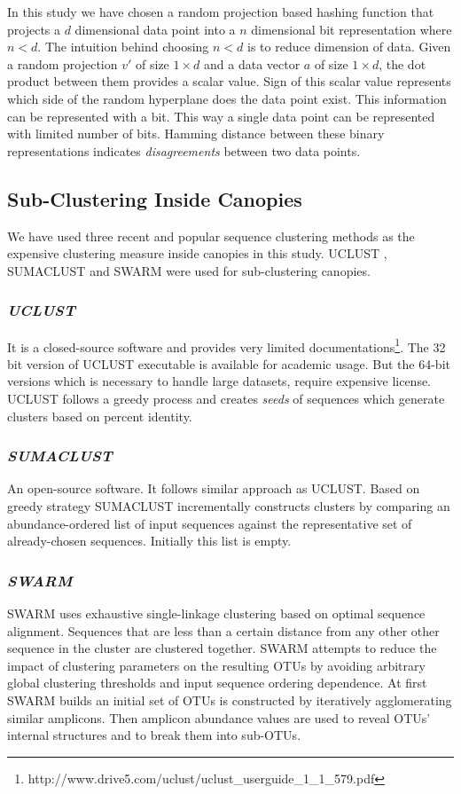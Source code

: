\documentclass[10pt, conference, compsocconf]{IEEEtran}
\begin{document}
In this study we have chosen a random projection based hashing function that projects a $d$ dimensional data point into a $n$ dimensional bit representation where $n<d$. The intuition behind choosing $n<d$ is to reduce dimension of data. Given a random projection $v'$ of size $1 \times d$ and a data vector $a$ of size $1 \times d$, the dot product between them provides a scalar value. Sign of this scalar value represents which side of the random hyperplane does the data point exist. This information can be represented with a bit. This way a single data point can be represented with limited number of bits. Hamming distance between these binary representations indicates \textit{disagreements} between two data points.

\subsection{\textbf{Sub-Clustering Inside Canopies}}
\label{sub-cluster}
We have used three recent and popular sequence clustering methods as the expensive clustering measure inside canopies in this study. UCLUST \cite{MARuclust}, SUMACLUST \cite{MARSumaclust} and SWARM \cite{MARSwarm} were used for sub-clustering canopies. 

\subsubsection{\textit{UCLUST}}
It is a closed-source software and provides very limited documentations\footnote{http://www.drive5.com/uclust/uclust\_userguide\_1\_1\_579.pdf}. The 32 bit version of UCLUST executable is available for academic usage. But the 64-bit versions which is necessary to handle large datasets, require expensive license. UCLUST follows a greedy process and creates \textit{seeds} of sequences which generate clusters based on percent identity.

\subsubsection{\textit{SUMACLUST}}
An open-source software. It follows similar approach as UCLUST. Based on greedy strategy SUMACLUST incrementally constructs clusters by comparing an abundance-ordered list of input sequences against the representative set of already-chosen sequences. Initially this list is empty.

\subsubsection{\textit{SWARM}}
SWARM uses exhaustive single-linkage clustering based on optimal sequence alignment. Sequences that are less than a certain distance from any other other sequence in the cluster are clustered together. SWARM attempts to reduce the impact of clustering parameters on the resulting OTUs by avoiding arbitrary global clustering thresholds and input sequence ordering dependence. At first SWARM builds an initial set of OTUs is constructed by iteratively agglomerating similar amplicons. Then amplicon abundance values are used to reveal OTUs’ internal structures and to break them into sub-OTUs.
\end{document}
